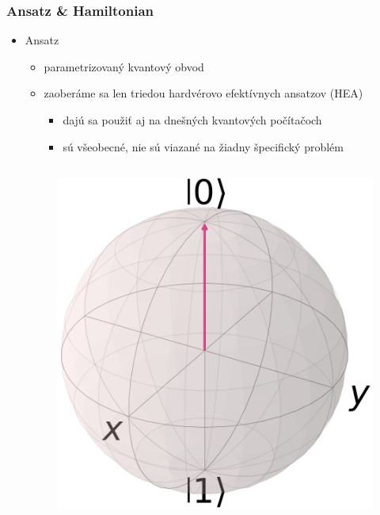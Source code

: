 \documentclass{beamer}
\begin{document}
\begin{frame}
    \frametitle{Ansatz \& Hamiltonian}
	\begin{itemize}
        \item Ansatz
        \begin{itemize}
            \item parametrizovaný kvantový obvod
            \item zaoberáme sa len triedou hardvérovo efektívnych ansatzov (HEA)
            \begin{itemize}
                \item dajú sa použiť aj na dnešných kvantových počítačoch
                \item sú všeobecné, nie sú viazané na žiadny špecifický problém
            \end{itemize}
        \end{itemize}
        \vspace{10pt}

        \begin{columns}[c]
            \begin{column}{.4\textwidth}
                \centering
                \begin{figure}
                \includegraphics[width=.6\textwidth]{qubit0.png}            
                \end{figure}
            \end{column}
                                  

\end{columns}
\end{itemize}
\end{frame}
\end{document}
